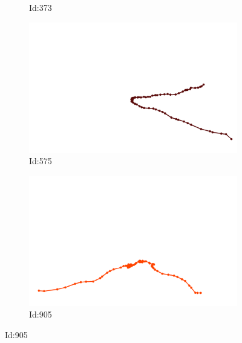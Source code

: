 \documentclass[12pt,twoside]{report}
\begin{document}
\begin{figure}
\begin{subfigure}[b]{0.20\textwidth}
\caption{Id:373}
\end{subfigure}
\begin{subfigure}[b]{0.20\textwidth}
\centering
\includegraphics[width=\textwidth]{../../trajectories/575.png}
\caption{Id:575}
\end{subfigure}
\begin{subfigure}[b]{0.20\textwidth}
\centering
\includegraphics[width=\textwidth]{../../trajectories/905.png}
\caption{Id:905}
\end{subfigure}
\end{figure}
\end{document}
